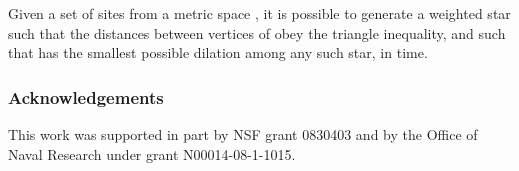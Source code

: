 \documentclass{llncs}
\begin{document}
\begin{theorem}
Given a set  of  sites from a metric space , it is possible to generate a weighted star  such that the distances between vertices of  obey the triangle inequality, and such that  has the smallest possible dilation among any such star, in  time.
\end{theorem}


\subsubsection*{Acknowledgements}

This work was supported in part by NSF grant
0830403 and by the Office of Naval Research under grant
N00014-08-1-1015.

\small\raggedright
 
\end{document}
